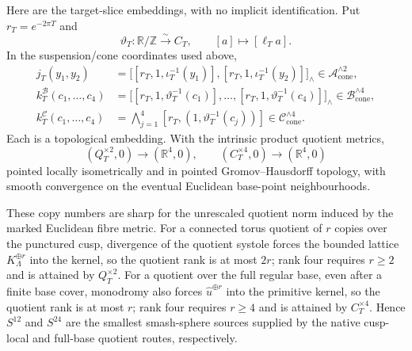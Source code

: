 \documentclass[10pt,letterpaper]{article}
\begin{document}
Here are the target-slice embeddings, with no implicit identification.  Put
$r_T=e^{-2\pi T}$ and
\[
 \vartheta_T:\mathbb R/\mathbb Z\xrightarrow{\sim}C_T,
 \qquad[a]\longmapsto[\ell_Ta].
\]
In the suspension/cone coordinates used above,
\[
 \begin{aligned}
 j_T(y_1,y_2)
 &=\bigl[[r_T,1,\iota_T^{-1}(y_1)],
          [r_T,1,\iota_T^{-1}(y_2)]\bigr]_{\wedge}
 \in\mathcal A_{\mathrm{cone}}^{\wedge2},\\
 k_T^{\mathcal B}(c_1,\ldots,c_4)
 &=\bigl[[r_T,1,\vartheta_T^{-1}(c_1)],\ldots,
          [r_T,1,\vartheta_T^{-1}(c_4)]\bigr]_{\wedge}
 \in\mathcal B_{\mathrm{cone}}^{\wedge4},\\
 k_T^{\mathcal C}(c_1,\ldots,c_4)
 &=\bigwedge_{j=1}^4
   [r_T,(1,\vartheta_T^{-1}(c_j))]
 \in\mathcal C_{\mathrm{cone}}^{\wedge4}.
 \end{aligned}
\]
Each is a topological embedding.  With the intrinsic product quotient
metrics,
\[
 (Q_T^{\times2},0)\longrightarrow(\mathbb R^4,0),
 \qquad
 (C_T^{\times4},0)\longrightarrow(\mathbb R^4,0)
\]
pointed locally isometrically and in pointed Gromov--Hausdorff topology,
with smooth convergence on the eventual Euclidean base-point
neighbourhoods.

These copy numbers are sharp for the unrescaled quotient norm induced by
the marked Euclidean fibre metric.  For a connected torus quotient of $r$
copies over the punctured cusp, divergence of the quotient systole forces
the bounded lattice $K_\Lambda^{\oplus r}$ into the kernel, so the quotient
rank is at most $2r$; rank four requires $r\ge2$ and is attained by
$Q_T^{\times2}$.  For a quotient over the full regular base, even after a
finite base cover, monodromy also forces
$\widehat u^{\oplus r}$ into the primitive kernel, so the quotient rank is
at most $r$; rank four requires $r\ge4$ and is attained by
$C_T^{\times4}$.  Hence $S^{12}$ and $S^{24}$ are the smallest smash-sphere
sources supplied by the native cusp-local and full-base quotient routes,
respectively.
\end{document}
